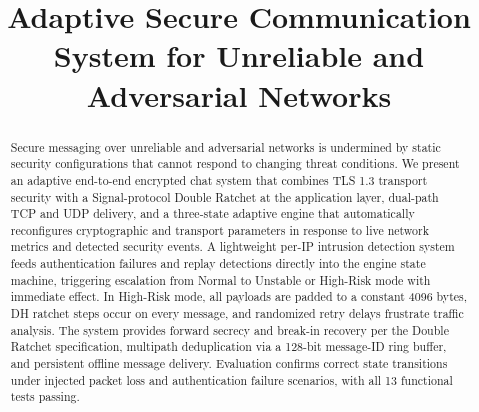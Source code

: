 \documentclass[conference]{IEEEtran}
\begin{document}
\title{Adaptive Secure Communication System for Unreliable and Adversarial Networks}

\author{
\and
{}
\and
{}
}

\maketitle

\begin{abstract}
Secure messaging over unreliable and adversarial networks is undermined by static security
configurations that cannot respond to changing threat conditions. We present an adaptive
end-to-end encrypted chat system that combines TLS 1.3 transport security with a
Signal-protocol Double Ratchet at the application layer, dual-path TCP and UDP delivery,
and a three-state adaptive engine that automatically reconfigures cryptographic and
transport parameters in response to live network metrics and detected security events.
A lightweight per-IP intrusion detection system feeds authentication failures and replay
detections directly into the engine state machine, triggering escalation from Normal to
Unstable or High-Risk mode with immediate effect. In High-Risk mode, all payloads are
padded to a constant 4096 bytes, DH ratchet steps occur on every message, and randomized
retry delays frustrate traffic analysis. The system provides forward secrecy and
break-in recovery per the Double Ratchet specification, multipath deduplication via a
128-bit message-ID ring buffer, and persistent offline message delivery. Evaluation
confirms correct state transitions under injected packet loss and authentication failure
scenarios, with all 13 functional tests passing.
\end{abstract}
\end{document}
